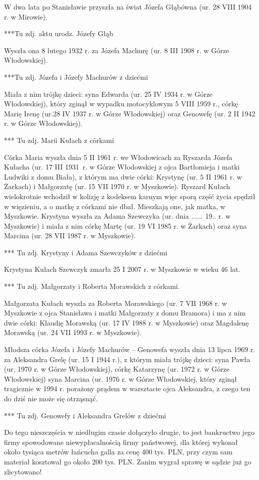 W dwa lata po Stanisławie przyszła na świat Józefa Głąbówna (ur. 28 VIII 1904 r. w Mirowie).

***Tu zdj. aktu urodz. Józefy Głąb

Wyszła ona 8 lutego 1932 r. za Józefa Machurę (ur. 8 III 1908 r. w Górze Włodowskiej).

{\color{red}
***Tu zdj. Józefa i Józefy Machurów z dziećmi}

Miała z nim trójkę dzieci: syna Edwarda (ur. 25 IV 1934 r. w Górze Włodowskiej), który zginął w wypadku motocyklowym 5 VIII 1959 r., córkę Marię Irenę (ur.28 IV 1937 r. w Górze Włodowskiej) oraz Genowefę (ur. 2 II 1942 r. w Górze Włodowskiej).

{\color{red}
*** Tu zdj. Marii Kułach z córkami}

Córka Maria wyszła dnia 5 II 1961 r. we Włodowicach za Ryszarda Józefa Kułacha (ur. 17 III 1931~r. w Górze Włodowskiej z ojca Bartłomieja i matki Ludwiki z domu Biała), z którym ma dwie córki: Krystynę (ur. 5 II 1961 r. w Żarkach) i Małgorzatę (ur. 15 VII 1970 r. w Myszkowie). Ryszard Kułach wielokrotnie wchodził w kolizję z kodeksem karnym więc sporą część życia spędził w więzieniu, a o matkę z córkami nie dbał. Mieszkają one, jak matka, w Myszkowie. Krystyna wyszła za Adama Szewczyka 
(ur. dnia ...... 19.. r. w Myszkowie) i miała z nim córkę Martę (ur. 19 VI 1985 r. w Żarkach) oraz syna Marcina (ur. 28 VII 1987 r. w Myszkowie).

{\color{red}
*** Tu zdj. Krystyny i Adama Szewczyków z dziećmi}

Krystyna Kułach Szewczyk zmarła 25 I 2007 r. w Myszkowie w wieku 46 lat.

{\color{red}
*** Tu zdj. Małgorzaty i Roberta Morawskich z córkami.}

Małgorzata Kułach wyszła za Roberta Morawskiego (ur. 7 VII 1968 r. w Myszkowie z ojca Stanisława i matki Małgorzaty z domu Bramora) i ma z nim dwie córki: Klaudię Morawską (ur. 17 IV 1988 r. w Myszkowie) oraz Magdalenę Morawską (ur. 24 VII 1993 r. w Myszkowie). 

Młodsza  córka Józefa i Józefy Machurów -- Genowefa wyszła dnia 13 lipca 1969 r. za Aleksandra Grelę (ur. 15 I 1944 r.), z którym miała trójkę dzieci: syna Pawła (ur. 1970 r. w Górze Włodowskiej), córkę Katarzynę (ur. 1972 r. w Górze Włodowskiej) syna Marcina (ur. 1976 r. w Górze Włodowskiej, który zginął tragicznie w 1994 r. porażony prądem w warsztacie ojca Aleksandra, z czego ten do dziś nie może się otrząsnąć.

{\color{red}
*** Tu zdj. Genowefy i Aleksandra Grelów z dziećmi}

Do tego nieszczęścia w niedługim czasie dołączyło drugie, to jest bankructwo jego firmy spowodowane niewypłacalnością firmy państwowej, dla której wykonał około tysiąca metrów łańcucha galla za cenę 400 tys. PLN, przy czym sam materiał kosztował go około 200 tys. PLN. Zanim wygrał sprawę w sądzie już go zlicytowano!
